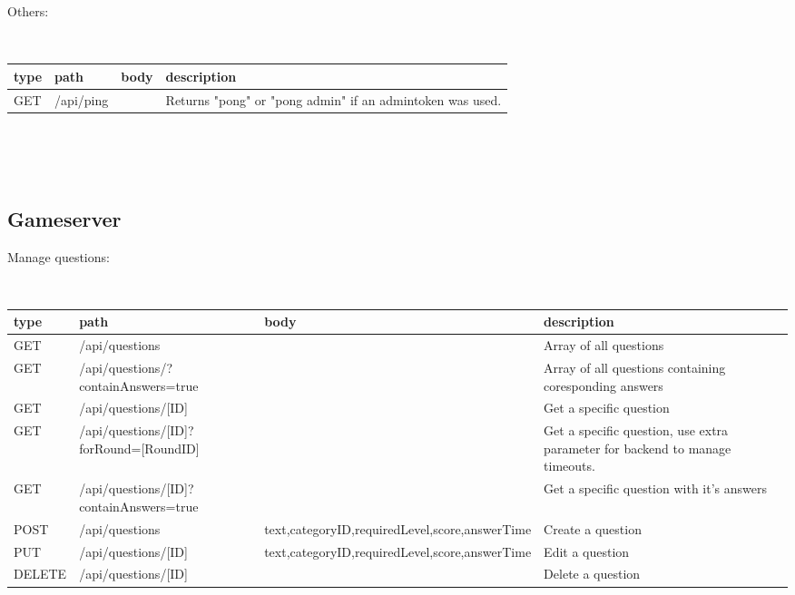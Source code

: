\noindent Others:
\begin{small}
\\ \hspace*{-1cm} \begin{tabular}{|p{1.5cm}| p{4.5cm} | p{2.5cm} | p{6cm} |}
    \hline
    type & path & body & description \\ \hline
    GET & /api/ping && Returns "pong" or "pong admin" if an admintoken was used.\\ \hline
   \end{tabular}
\end{small}\\\\\\
\subsection{Gameserver}
\noindent Manage questions:
\begin{small}
\\ \hspace*{-1cm} \begin{tabular}{|p{1.5cm}| p{4.5cm} | p{2.5cm} | p{6cm} |}
    \hline
    type & path & body & description \\ \hline
    GET & /api/questions & & Array of all questions \\ \hline
    GET & /api/questions/\newline?containAnswers=true & & Array of all questions containing coresponding answers  \\ \hline
    GET & /api/questions/[ID] & & Get a specific question  \\ \hline
    GET & /api/questions/[ID]\newline?forRound=[RoundID] & & Get a specific question, use extra parameter for backend to manage timeouts. \\ \hline
    GET & /api/questions/[ID]\newline?containAnswers=true & & Get a specific question with it's answers \\ \hline

    
    POST & /api/questions & text,\newline categoryID,\newline requiredLevel,\newline score,\newline answerTime & Create a question  \\ \hline
    PUT & /api/questions/[ID] & text,\newline categoryID,\newline requiredLevel,\newline score,\newline answerTime & Edit a question  \\ \hline
    DELETE & /api/questions/[ID] & & Delete a question  \\ \hline
   \end{tabular}
\end{small}\\\\\\
